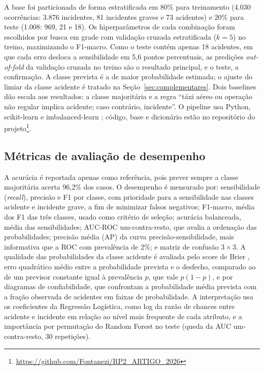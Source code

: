 \documentclass[12pt]{article}
\begin{document}
    A base foi particionada de forma estratificada em 80\% para treinamento (4.030 ocorrências: 3.876 incidentes, 81 incidentes graves e 73 acidentes) e 20\% para teste (1.008: 969, 21 e 18). Os hiperparâmetros de cada combinação foram escolhidos por busca em grade com validação cruzada estratificada ($k = 5$) no treino, maximizando o F1-macro. Como o teste contém apenas 18 acidentes, em que cada erro desloca a sensibilidade em 5,6 pontos percentuais, as predições \textit{out-of-fold} da validação cruzada no treino são o resultado principal, e o teste, a confirmação. A classe prevista é a de maior probabilidade estimada; o ajuste do limiar da classe acidente é tratado na Seção~\ref{sec:complementares}. Dois baselines dão escala aos resultados: a classe majoritária e a regra ``táxi aéreo ou operação não regular implica acidente; caso contrário, incidente''. O pipeline usa Python, scikit-learn \cite{pedregosa:2011} e imbalanced-learn \cite{lemaitre:2017}; código, base e dicionário estão no repositório do projeto\footnote{\url{https://github.com/Fontanezi/RP2_ARTIGO_2026}}.

    \subsection{Métricas de avaliação de desempenho}
    \label{sec:metricas}

    A acurácia é reportada apenas como referência, pois prever sempre a classe majoritária acerta 96,2\% dos casos. O desempenho é mensurado por: sensibilidade (\textit{recall}), precisão e F1 por classe, com prioridade para a sensibilidade nas classes acidente e incidente grave, a fim de minimizar falsos negativos; F1-macro, média dos F1 das três classes, usado como critério de seleção; acurácia balanceada, média das sensibilidades; AUC-ROC um-contra-resto, que avalia a ordenação das probabilidades; precisão média (AP) da curva precisão-sensibilidade, mais informativa que a ROC com prevalência de 2\%; e matriz de confusão $3 \times 3$. A qualidade das probabilidades da classe acidente é avaliada pelo score de Brier \cite{brier:1950}, erro quadrático médio entre a probabilidade prevista e o desfecho, comparado ao de um previsor constante igual à prevalência $p$, que vale $p(1-p)$, e por diagramas de confiabilidade, que confrontam a probabilidade média prevista com a fração observada de acidentes em faixas de probabilidade. A interpretação usa os coeficientes da Regressão Logística, como log da razão de chances entre acidente e incidente em relação ao nível mais frequente de cada atributo, e a importância por permutação do Random Forest no teste (queda da AUC um-contra-resto, 30 repetições).
\end{document}
